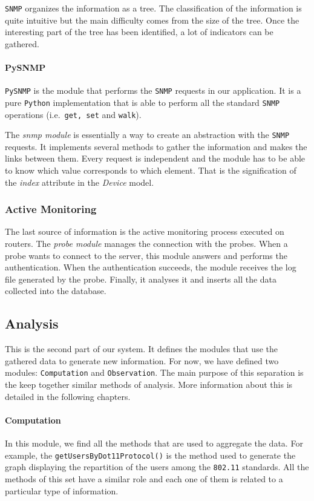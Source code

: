 \texttt{SNMP} organizes the information as a tree. The classification of the information is quite intuitive but the main difficulty comes from the size of the tree. Once the interesting part of the tree has been identified, a lot of indicators can be gathered.

\paragraph*{PySNMP} \texttt{PySNMP} is the module that performs the \texttt{SNMP} requests in our application. It is a pure \texttt{Python} implementation that is able to perform all the standard \texttt{SNMP} operations (i.e.\  \texttt{get, set} and \texttt{walk}).

The \emph{snmp module} is essentially a way to create an abstraction with the \texttt{SNMP} requests. It implements several methods to gather the information and makes the links between them. Every request is independent and the module has to be able to know which value corresponds to which element. That is the signification of the \emph{index} attribute in the \emph{Device} model.



\subsubsection{Active Monitoring}
The last source of information is the active monitoring process executed on routers. The \emph{probe module} manages the connection with the probes. When a probe wants to connect to the server, this module answers and performs the authentication. When the authentication succeeds, the module receives the log file generated by the probe. Finally, it analyses it and inserts all the data collected into the database.

\subsection{Analysis}
This is the second part of our system. It defines the modules that use the gathered data to generate new information. For now, we have defined two modules: \texttt{Computation} and \texttt{Observation}. The main purpose of this separation is the keep together similar methods of analysis. More information about this is detailed in the following chapters.

\paragraph*{Computation} In this module, we find all the methods that are used to aggregate the data. For example, the \texttt{getUsersByDot11Protocol()} is the method used to generate the graph displaying the repartition of the users among the \texttt{802.11} standards. All the methods of this set have a similar role and each one of them is related to a particular type of information.

